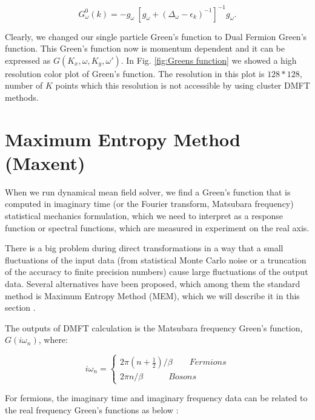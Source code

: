 \begin{equation}
    G_\omega ^0 (k)= -g_\omega \: [g_\omega + (\Delta _\omega - \epsilon _k)^{-1}]^{-1} g_\omega.
\end{equation}

Clearly, we changed our single particle Green's function to Dual Fermion Green's function. This Green's function now is momentum dependent and it can be expressed as  $G(K_x, \omega, K_y, \omega') $. In Fig. \ref{fig:Greens function} we showed a high resolution color plot of Green's function. The resolution in this plot is $128*128$, number of $K$ points which this resolution is not accessible by using cluster DMFT methods.








\section{ Maximum Entropy Method (Maxent)}

When we run dynamical mean field solver, we find a Green's function that is computed in imaginary time  (or the
Fourier transform, Matsubara frequency) statistical mechanics formulation, which we need to interpret as a response function or spectral functions, which are measured in experiment on the real axis.

There is a big problem during direct transformations in a way that a small fluctuations of the input data (from statistical Monte Carlo noise or a truncation of the accuracy to finite precision numbers) cause large fluctuations of the output data. Several alternatives have been proposed, which among them the standard method is Maximum Entropy Method (MEM), which we will describe it in this section \cite{Ryan, Sivia, Jarrell, M.Jarrell}.

The outputs of DMFT calculation is the Matsubara frequency Green's function, $G(i\omega _n)$, where:

\begin{equation}
    i\omega _n =\begin{cases}
    2\pi (n+ \frac{1}{2}) / \beta \qquad Fermions \\
    2\pi n/ \beta \qquad \quad Bosons
    \end{cases}
\end{equation}



For  fermions, the imaginary time and imaginary frequency data can be related to the real frequency Green's functions as below \cite{Ryan}:

